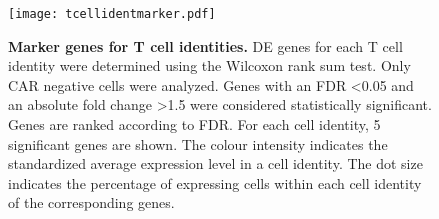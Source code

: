 \documentclass[10pt]{paper}
\renewcommand\_{\textunderscore\allowbreak}
\begin{document}
\begin{figure}[ht!]
  \texttt{[image: tcell\_ident\_marker.pdf]}
  \captionsetup{format=plain}
  \caption[Marker genes for T cell identities]
  {\textbf{Marker genes for T cell identities.} DE genes for each T cell identity were determined using the Wilcoxon rank sum test. Only CAR negative cells were analyzed. Genes with an FDR <0.05 and an absolute fold change >1.5 were considered statistically significant. Genes are ranked according to FDR. For each cell identity, 5 significant genes are shown. The colour intensity indicates the standardized average expression level in a cell identity. The dot size indicates  the percentage of expressing cells within each cell identity of the corresponding genes.
  }
  \label{fig:tcell_marker}
\end{figure}
\end{document}
